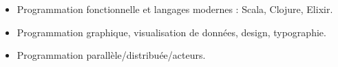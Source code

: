 \documentclass[a4paper, 10pt]{article}
\newcommand{\overlay}[1]{\fontspec[Alternate=1, Ligatures={Common, Rare}]{Hoefler Text}\fontsize{160pt}{0pt}\selectfont #1}%
\begin{document}
\begin{minipage}[t]{0.38\linewidth}
    \begin{itemize}[leftmargin=10.5pt, rightmargin=0pt, labelsep=5pt, itemsep=0pt, topsep=0pt]
      \item Programmation fonctionnelle et langages modernes : Scala, Clojure, Elixir.
      \item Programmation graphique, visualisation de donn\'ees, design, typographie.
      \item Programmation parall\`ele/distribu\'ee/acteurs.
    \end{itemize}
  \end{minipage}

\end{document}
